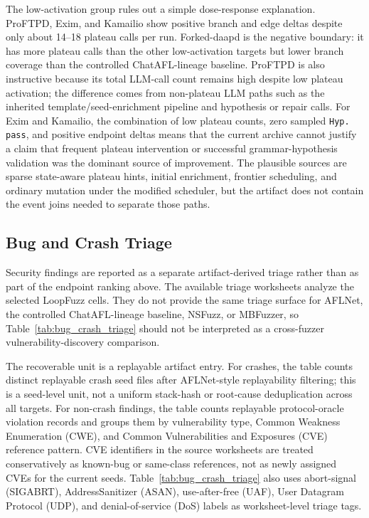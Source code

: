 \documentclass[final,5p,times,number]{elsarticle}
\begin{document}
The low-activation group rules out a simple dose-response explanation. ProFTPD, Exim, and Kamailio show positive branch and edge deltas despite only about 14--18 plateau calls per run. Forked-daapd is the negative boundary: it has more plateau calls than the other low-activation targets but lower branch coverage than the controlled ChatAFL-lineage baseline. ProFTPD is also instructive because its total LLM-call count remains high despite low plateau activation; the difference comes from non-plateau LLM paths such as the inherited template/seed-enrichment pipeline and hypothesis or repair calls. For Exim and Kamailio, the combination of low plateau counts, zero sampled \texttt{Hyp. pass}, and positive endpoint deltas means that the current archive cannot justify a claim that frequent plateau intervention or successful grammar-hypothesis validation was the dominant source of improvement. The plausible sources are sparse state-aware plateau hints, initial enrichment, frontier scheduling, and ordinary mutation under the modified scheduler, but the artifact does not contain the event joins needed to separate those paths.

\subsection{Bug and Crash Triage}
\label{sec:bug_crash_triage}

Security findings are reported as a separate artifact-derived triage rather than as part of the endpoint ranking above. The available triage worksheets analyze the selected LoopFuzz cells. They do not provide the same triage surface for AFLNet, the controlled ChatAFL-lineage baseline, NSFuzz, or MBFuzzer, so Table~\ref{tab:bug_crash_triage} should not be interpreted as a cross-fuzzer vulnerability-discovery comparison.

The recoverable unit is a replayable artifact entry. For crashes, the table counts distinct replayable crash seed files after AFLNet-style replayability filtering; this is a seed-level unit, not a uniform stack-hash or root-cause deduplication across all targets. For non-crash findings, the table counts replayable protocol-oracle violation records and groups them by vulnerability type, Common Weakness Enumeration (CWE), and Common Vulnerabilities and Exposures (CVE) reference pattern. CVE identifiers in the source worksheets are treated conservatively as known-bug or same-class references, not as newly assigned CVEs for the current seeds. Table~\ref{tab:bug_crash_triage} also uses abort-signal (SIGABRT), AddressSanitizer (ASAN), use-after-free (UAF), User Datagram Protocol (UDP), and denial-of-service (DoS) labels as worksheet-level triage tags.
\end{document}
